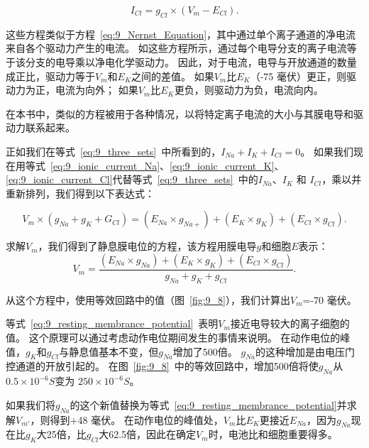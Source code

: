 \begin{proposition}[利用等效回路模型计算静息膜电位]
	\begin{equation}\label{eq:9_ionic_current_Cl}
		I_{Cl} = g_{Cl} \times (V_m - E_{Cl}).
	\end{equation}
	
	\quad \quad 这些方程类似于方程~\ref{eq:9_Nernst_Equation}，其中通过单个离子通道的净电流来自各个驱动力产生的电流。
	如这些方程所示，通过每个电导分支的离子电流等于该分支的电导乘以净电化学驱动力。
	因此，对于电流，电导与开放通道的数量成正比，驱动力等于$V_m$和$E_K$之间的差值。
	如果$V_m$比$E_K$（-75 毫伏）更正，则驱动力为正，电流为向外；
	如果$V_m$比$E_K$更负，则驱动力为负，电流向内。
	
	\quad \quad 在本书中，类似的方程被用于各种情况，以将特定离子电流的大小与其膜电导和驱动力联系起来。
	
	\quad \quad 正如我们在等式~\ref{eq:9_three_sets}~中所看到的，$ I_{Na} + I_{K} + I_{Cl} = 0 $。
	如果我们现在用等式~\ref{eq:9_ionic_current_Na}、\ref{eq:9_ionic_current_K}、\ref{eq:9_ionic_current_Cl}代替等式~\ref{eq:9_three_sets}~中的$ I_{Na} $、$ I_{K} $ 和 $ I_{Cl} $，乘以并重新排列，我们得到以下表达式：
	
	\begin{equation}\label{eq:9_rearrange_three}
		V_m \times (g_{Na} + g_K + G_{Cl}) = 
		(E_{Na} \times g_{Na+}) + (E_K \times g_K) + (E_{Cl} \times g_{Cl}).
	\end{equation}
	
	\quad \quad 求解$V_m$，我们得到了静息膜电位的方程，该方程用膜电导$ g $和细胞$ E $表示：
	\begin{equation}\label{eq:9_resting_membrance_potential}
		V_m = 
		\frac{
			(E_{Na} \times g_{Na}) + 
			(E_K \times g_K) + 
			(E_{Cl} \times g_{Cl})
		}
		{
			g_{Na} + g_{K} + g_{Cl}
		}.
	\end{equation}
	
	\quad \quad 从这个方程中，使用等效回路中的值（图~\ref{fig:9_8}），我们计算出$V_m$=-70 毫伏。
	
	\quad \quad 等式~\ref{eq:9_resting_membrance_potential}~表明$V_m$接近电导较大的离子细胞的值。
	这个原理可以通过考虑动作电位期间发生的事情来说明。
	在动作电位的峰值，$ g_K $和$ g_{Cl} $与静息值基本不变，但$ g_{Na} $增加了500倍。
	$ g_{Na} $的这种增加是由电压门控通道的开放引起的。
	在图~\ref{fig:9_8}~中的等效回路中，增加500倍将使$ g_{Na} $从 $ 0.5\times 10^{-6} S$变为 $ 250 \times 10^{-6} S $。
	
	\quad \quad 如果我们将$ g_{Na} $的这个新值替换为等式~\ref{eq:9_resting_membrance_potential}并求解$V_{m'}$，则得到+48 毫伏。
	在动作电位的峰值处，$V_m$比$E_K$更接近$ E_{Na} $，因为$ g_{Na} $现在比$ g_K $大25倍，比$ g_{Cl} $大62.5倍，因此在确定$V_m$时，电池比和细胞重要得多。
	

\end{proposition}

